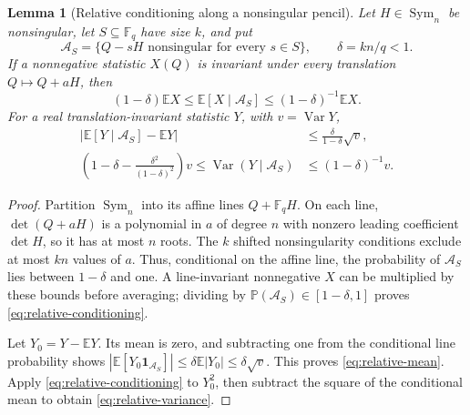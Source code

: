 \documentclass[11pt,a4paper]{article}
\newtheorem{lemma}[theorem]{Lemma}
\theoremstyle{definition}
\theoremstyle{remark}
\newcommand{\F}{\mathbb F}
\newcommand{\E}{\mathbb E}
\newcommand{\Pp}{\mathbb P}
\newcommand{\Sym}{\operatorname{Sym}}
\newcommand{\Var}{\operatorname{Var}}
\newcommand{\one}{\mathbf 1}
\begin{document}
\begin{lemma}[Relative conditioning along a nonsingular pencil]
\label{lem:pencil-conditioning}
Let $H\in\Sym_n$ be nonsingular, let $S\subseteq\F_q$ have size $k$,
and put
\[
 \mathcal A_S=\{Q-sH\text{ nonsingular for every }s\in S\},\qquad
 \delta=kn/q<1.
\]
If a nonnegative statistic $X(Q)$ is invariant under every translation
$Q\mapsto Q+aH$, then
\begin{equation}\label{eq:relative-conditioning}
 (1-\delta)\E X\le\E[X\mid\mathcal A_S]
                  \le(1-\delta)^{-1}\E X.
\end{equation}
For a real translation-invariant statistic $Y$, with $v=\Var Y$,
\begin{align}
 |\E[Y\mid\mathcal A_S]-\E Y|
 &\le\frac{\delta}{1-\delta}\sqrt v,\label{eq:relative-mean}\\
 \left(1-\delta-\frac{\delta^2}{(1-\delta)^2}\right)v
 \le\Var(Y\mid\mathcal A_S)&\le(1-\delta)^{-1}v.
 \label{eq:relative-variance}
\end{align}
\end{lemma}
\begin{proof}
Partition $\Sym_n$ into its affine lines $Q+\F_q H$.
On each line, $\det(Q+aH)$ is a polynomial in $a$ of degree $n$ with
nonzero leading coefficient $\det H$, so it has at most $n$ roots.
The $k$ shifted nonsingularity conditions exclude at most $kn$ values
of $a$. Thus, conditional on the affine line, the probability of
$\mathcal A_S$ lies between $1-\delta$ and one. A line-invariant
nonnegative $X$ can be multiplied by these bounds before averaging;
dividing by $\Pp(\mathcal A_S)\in[1-\delta,1]$ proves
\eqref{eq:relative-conditioning}.

Let $Y_0=Y-\E Y$. Its mean is zero, and subtracting one from the
conditional line probability shows
$|\E[Y_0\one_{\mathcal A_S}]|\le\delta\E|Y_0|\le\delta\sqrt v$.
This proves \eqref{eq:relative-mean}. Apply
\eqref{eq:relative-conditioning} to $Y_0^2$, then subtract the square
of the conditional mean to obtain \eqref{eq:relative-variance}.
\end{proof}
\end{document}
